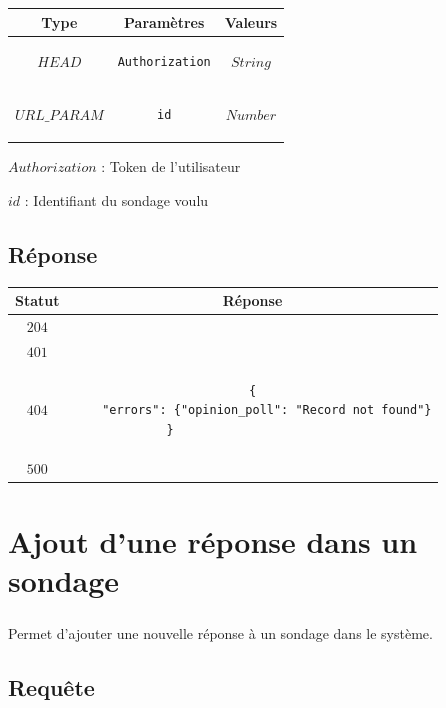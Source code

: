 \documentclass[titlepage]{report}
\begin{document}
\begin{center}
	\begin{tabular}{|c|c|c|}
		\hline
		Type & Paramètres & Valeurs \\
		\hline
		$ HEAD $ & 
		\begin{lstlisting}
Authorization
		\end{lstlisting} &
		$ String $ \\ 
		\hline
		$ URL\_PARAM $ & 
		\begin{lstlisting}
id
		\end{lstlisting} &
		$ Number $ \\
		\hline	
	\end{tabular}
\end{center}

\par $Authorization$ : Token de l’utilisateur
\par $id$ : Identifiant du sondage voulu


\section{Réponse}

\begin{center}
	\begin{tabular}{|c|c|}
		\hline
		Statut & Réponse \\
		\hline
		$ 204 $ &  \\ 
		\hline
		$ 401 $ & \\
		\hline
		$ 404 $ &\begin{lstlisting}
{
	"errors": {"opinion_poll": "Record not found"}
}						
		\end{lstlisting}
		\\
		\hline
		$ 500 $ & \\
		\hline
	\end{tabular}
\end{center}

\chapter{Ajout d'une réponse dans un sondage}

\paragraph{} Permet d’ajouter une nouvelle réponse à un sondage dans le système.

\section{Requête}
\end{document}
